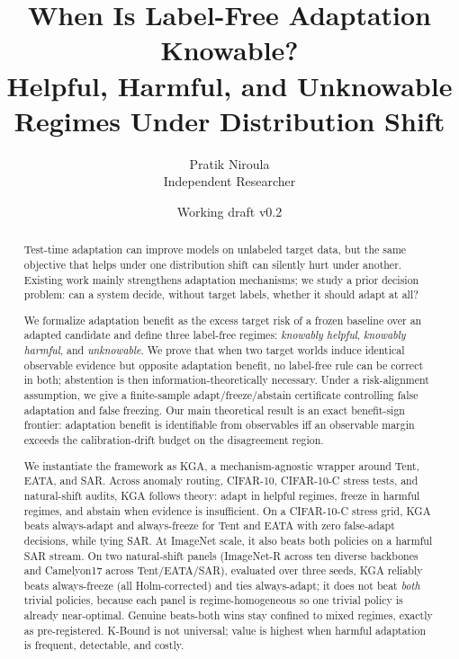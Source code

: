 \documentclass[11pt]{article}
\title{\textbf{When Is Label-Free Adaptation Knowable?}\\[2pt]
\large Helpful, Harmful, and Unknowable Regimes Under Distribution Shift}
\author{Pratik Niroula\\ \small Independent Researcher}
\date{Working draft v0.2}
\theoremstyle{plain}
\theoremstyle{definition}
\begin{document}
\maketitle

\begin{abstract}
Test-time adaptation can improve models on unlabeled target data, but the same
objective that helps under one distribution shift can silently hurt under another.
Existing work mainly strengthens adaptation mechanisms; we study a prior decision
problem: can a system decide, without target labels, whether it should adapt at all?

We formalize adaptation benefit as the excess target risk of a frozen baseline over
an adapted candidate and define three label-free regimes: \emph{knowably helpful},
\emph{knowably harmful}, and \emph{unknowable}. We prove that when two target worlds
induce identical observable evidence but opposite adaptation benefit, no label-free
rule can be correct in both; abstention is then information-theoretically necessary.
Under a risk-alignment assumption, we give a finite-sample adapt/freeze/abstain
certificate controlling false adaptation and false freezing. Our main theoretical
result is an exact benefit-sign frontier: adaptation benefit is identifiable from
observables iff an observable margin exceeds the calibration-drift budget on the
disagreement region.

We instantiate the framework as \textsc{KGA}, a mechanism-agnostic wrapper around
Tent, EATA, and SAR. Across anomaly routing, CIFAR-10, CIFAR-10-C stress tests, and
natural-shift audits, \textsc{KGA} follows theory: adapt in helpful regimes, freeze
in harmful regimes, and abstain when evidence is insufficient. On a CIFAR-10-C stress grid,
\textsc{KGA} beats always-adapt and always-freeze for Tent and EATA with zero
false-adapt decisions, while tying SAR. At ImageNet scale, it also beats both
policies on a harmful SAR stream. On two natural-shift panels (ImageNet-R across
ten diverse backbones and Camelyon17 across Tent/EATA/SAR), evaluated over three
seeds, \textsc{KGA} reliably beats always-freeze (all Holm-corrected) and ties
always-adapt; it does not beat \emph{both} trivial policies, because each panel is
regime-homogeneous so one trivial policy is already near-optimal. Genuine
beats-both wins stay confined to mixed regimes, exactly as pre-registered. K-Bound
is not universal; value is highest when harmful adaptation is frequent, detectable,
and costly.
\end{abstract}
\end{document}
